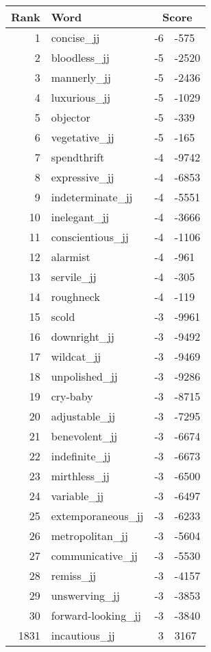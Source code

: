 \begin{longtable}[!htbp]{| rlr@{.}l |}
    \hline
    \textbf{Rank} & \textbf{Word} & \multicolumn{2}{c|}{\textbf{Score}} \\
    \hline
    \endhead
    1 & concise\_jj & -6 & -575 \\
    2 & bloodless\_jj & -5 & -2520 \\
    3 & mannerly\_jj & -5 & -2436 \\
    4 & luxurious\_jj & -5 & -1029 \\
    5 & objector & -5 & -339 \\
    6 & vegetative\_jj & -5 & -165 \\
    7 & spendthrift & -4 & -9742 \\
    8 & expressive\_jj & -4 & -6853 \\
    9 & indeterminate\_jj & -4 & -5551 \\
    10 & inelegant\_jj & -4 & -3666 \\
    11 & conscientious\_jj & -4 & -1106 \\
    12 & alarmist & -4 & -961 \\
    13 & servile\_jj & -4 & -305 \\
    14 & roughneck & -4 & -119 \\
    15 & scold & -3 & -9961 \\
    16 & downright\_jj & -3 & -9492 \\
    17 & wildcat\_jj & -3 & -9469 \\
    18 & unpolished\_jj & -3 & -9286 \\
    19 & cry-baby & -3 & -8715 \\
    20 & adjustable\_jj & -3 & -7295 \\
    21 & benevolent\_jj & -3 & -6674 \\
    22 & indefinite\_jj & -3 & -6673 \\
    23 & mirthless\_jj & -3 & -6500 \\
    24 & variable\_jj & -3 & -6497 \\
    25 & extemporaneous\_jj & -3 & -6233 \\
    26 & metropolitan\_jj & -3 & -5604 \\
    27 & communicative\_jj & -3 & -5530 \\
    28 & remiss\_jj & -3 & -4157 \\
    29 & unswerving\_jj & -3 & -3853 \\
    30 & forward-looking\_jj & -3 & -3840 \\
    1831 & incautious\_jj & 3 & 3167 \\

\end{longtable}

